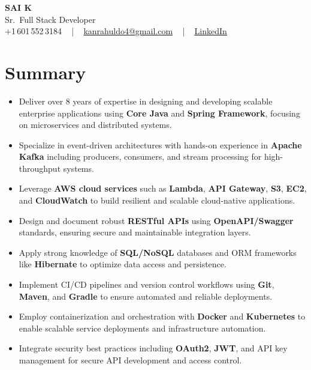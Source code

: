 \documentclass[letterpaper,11pt]{article}
\newcommand{\resumeItem}[1]{
  \item\footnotesize{
    {#1 \vspace{-2pt}}
  }
}
\newcommand{\resumeItemListStart}{\begin{itemize}[leftmargin=*]}
\newcommand{\resumeItemListEnd}{\end{itemize}\vspace{-5pt}}
\begin{document}
\begin{center}
    {\fontsize{14pt}{12pt}\selectfont \textbf{\MakeUppercase{Sai K}}}\\ \vspace{2pt}
    \fontsize{10pt}{12pt}\selectfont Sr.\ Full Stack Developer\\ \vspace{2pt}
    \fontsize{10pt}{12pt}\selectfont +1\,601\,552\,3184 ~ | ~
    \href{mailto:kanrahuldo4@gmail.com}{kanrahuldo4@gmail.com} ~ | ~
    \href{https://www.linkedin.com/in/srrrk/}{\color{blue}\underline{LinkedIn}}
    \vspace{-10pt}
\end{center}

\section{Summary}
\fontsize{9pt}{10pt}\selectfont
\resumeItemListStart
  \resumeItem{Deliver over 8 years of expertise in designing and developing scalable enterprise applications using \textbf{Core Java} and \textbf{Spring Framework}, focusing on microservices and distributed systems.}
  \resumeItem{Specialize in event-driven architectures with hands-on experience in \textbf{Apache Kafka} including producers, consumers, and stream processing for high-throughput systems.}
  \resumeItem{Leverage \textbf{AWS cloud services} such as \textbf{Lambda}, \textbf{API Gateway}, \textbf{S3}, \textbf{EC2}, and \textbf{CloudWatch} to build resilient and scalable cloud-native applications.}
  \resumeItem{Design and document robust \textbf{RESTful APIs} using \textbf{OpenAPI/Swagger} standards, ensuring secure and maintainable integration layers.}
  \resumeItem{Apply strong knowledge of \textbf{SQL/NoSQL} databases and ORM frameworks like \textbf{Hibernate} to optimize data access and persistence.}
  \resumeItem{Implement CI/CD pipelines and version control workflows using \textbf{Git}, \textbf{Maven}, and \textbf{Gradle} to ensure automated and reliable deployments.}
  \resumeItem{Employ containerization and orchestration with \textbf{Docker} and \textbf{Kubernetes} to enable scalable service deployments and infrastructure automation.}
  \resumeItem{Integrate security best practices including \textbf{OAuth2}, \textbf{JWT}, and API key management for secure API development and access control.}
\resumeItemListEnd
\vspace{-6pt}

\end{document}
